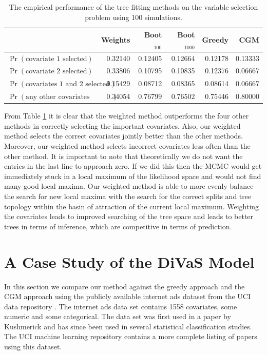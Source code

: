 
\begin{table}[ht]
\begin{center}
\begin{tabular}{l | rrrrr}
  \hline
  & Weights & Boot$_{100}$ & Boot$_{1000}$ & Greedy & CGM \\ 
  \hline
$\Pr(\text{covariate 1 selected})$ & 0.32140 & 0.12405 & 0.12664 & 0.12178 & 0.13333 \\ 
$\Pr(\text{covariate 2 selected})$ & 0.33806 & 0.10795 & 0.10835 & 0.12376 & 0.06667 \\ 
  $\Pr(\text{covariates 1 and 2 selected})$& 0.15429 & 0.08712 & 0.08365 & 0.08614 & 0.06667 \\ 
  $\Pr(\text{any other covariates  selected})$ & 0.34054 & 0.76799 & 0.76502 & 0.75446 & 0.80000 \\ 
   \hline
\end{tabular}
 \caption[Empirical covariate selection with 100 simulations]{The empirical performance of the tree fitting methods on the variable selection problem using 100 simulations.}
 \label{tab:sim_study}
 \end{center}
\end{table}


From Table \ref{tab:sim_study} it is clear that the weighted method outperforms the four other methods in correctly selecting the important covariates. Also, our weighted method selects the correct covariates jointly better than the other methods. Moreover, our weighted method selects incorrect covariates less often than the other method. It is important to note that theoretically we do not want the entries in the last line to approach zero. If we did this then the MCMC would get immediately stuck in a local maximum of the likelihood space and would not find many good local maxima. Our weighted method is able to more evenly balance the search for new local maxima with the search for the correct splits and tree topology within the basin of attraction of the current local maximum. Weighting the covariates leads to improved searching of the tree space and leads to better trees in terms of inference, which are competitive in terms of prediction.  

\newpage

\section{A Case Study of the DiVaS Model}\label{sec:real_data}
In this section we compare our method against the greedy approach and the CGM approach using the publicly available internet ads dataset from the UCI data repository \cite{Frank:2010uq}. The internet ads data set contains 1558 covariates, some numeric and some categorical. The data set was first used in a paper by Kushmerick \cite{kushmerick1999learning} and has since been used in several statistical classification studies. The UCI machine learning repository contains a more complete listing of papers using this dataset. 

